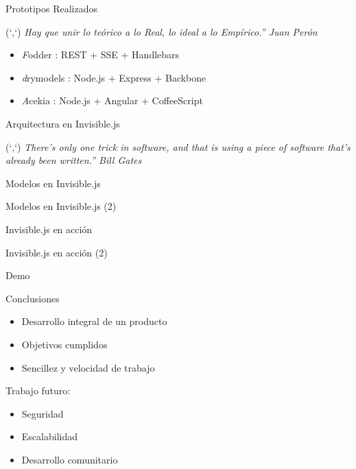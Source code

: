 \documentclass[xcolor=dvipsnames, 14pt]{beamer}
\newenvironment{reference}[2]{%
  \begin{textblock*}{\textwidth}(#1,#2)
      \footnotesize\it\bgroup\color{gray!50!black}}{\egroup\end{textblock*}}
\begin{document}
\begin{frame}{Prototipos Realizados}
\begin{reference}{4mm}{85mm}
``Hay que unir lo teórico a lo Real, lo ideal a lo Empírico.'' Juan Perón
\end{reference}

\begin{itemize}
    \item \emph Fodder : REST + SSE + Handlebars
    \item \emph drymodels : Node.js + Express + Backbone
    \item \emph Acekia : Node.js + Angular + CoffeeScript
\end{itemize}
\end{frame}

\begin{frame}{Arquitectura en Invisible.js}
\begin{reference}{4mm}{85mm}
``There's only one trick in software, and that is using a piece of software that's already been written.'' Bill Gates
\end{reference}

\end{frame}

\begin{frame}{Modelos en Invisible.js}

\end{frame}

\begin{frame}{Modelos en Invisible.js (2)}

\end{frame}

\begin{frame}{Invisible.js en acción}

\end{frame}

\begin{frame}{Invisible.js en acción (2)}

\end{frame}

\begin{frame}{Demo}

\end{frame}

\begin{frame}{Conclusiones}
\begin{itemize}
    \item Desarrollo integral de un producto
    \item Objetivos cumplidos
    \item Sencillez y velocidad de trabajo
\end{itemize}
\pause

Trabajo futuro:
\begin{itemize}
    \item Seguridad
    \item Escalabilidad
    \item Desarrollo comunitario
\end{itemize}


\end{frame}
\end{document}
